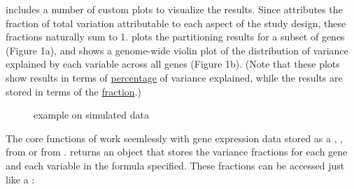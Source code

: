 \documentclass[12pt]{article}\usepackage[]{graphicx}\usepackage[]{xcolor}
\begin{document}
 includes a number of custom plots to visualize the results.  Since  attributes the fraction of total variation attributable to each aspect of the study design, these fractions naturally sum to 1.   plots the partitioning results for a subset of genes (Figure 1a), and  shows a genome-wide violin plot of the distribution of variance explained by each variable across all genes (Figure 1b).  (Note that these plots show results in terms of \underline{percentage} of variance explained, while the results are stored in terms of the \underline{fraction}.)
  
\begin{figure}[hb]
\centering
{}\quad
{}
\caption{
  example on simulated data}
\label{fig:lab}
\end{figure}

The core functions of  work seemlessly with gene expression data stored as a , ,  from  or  from .   returns an object that stores the variance fractions for each gene and each variable in the formula specified.  These fractions can be accessed just like a :
\end{document}
